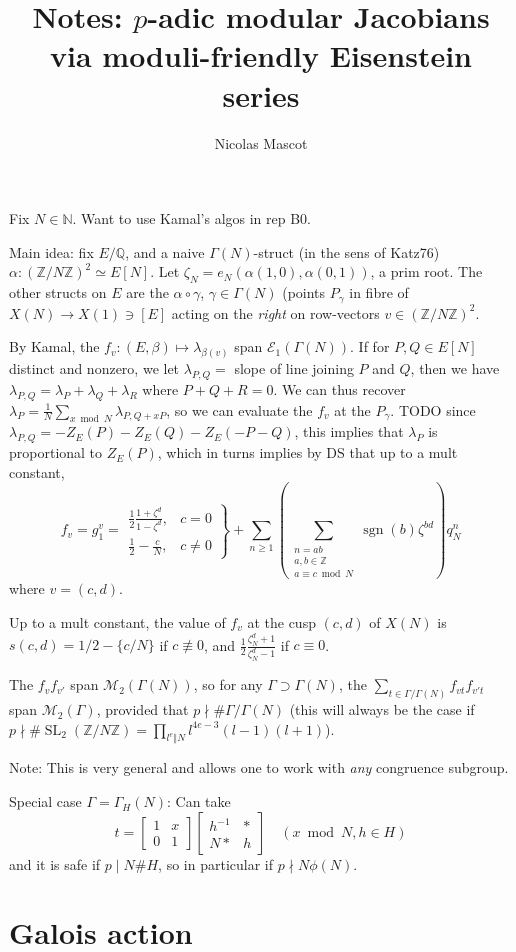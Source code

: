 \documentclass[12pt]{article}
\title{Notes: $p$-adic modular Jacobians via moduli-friendly Eisenstein series}
\author{Nicolas Mascot}
\newcommand{\N}{\mathbb{N}}
\newcommand{\Z}{\mathbb{Z}}
\newcommand{\Q}{\mathbb{Q}}
\newcommand{\M}{\mathcal{M}}
\newcommand{\E}{\mathcal{E}}
\newcommand{\SL}{\operatorname{SL}}
\newcommand{\sgn}{\operatorname{sgn}}
\newcommand{\smat}[4]{\left[ \begin{smallmatrix} #1 & #2 \\ #3 & #4 \end{smallmatrix} \right]}
\theoremstyle{definition}
\begin{document}
Fix $N \in \N$. Want to use Kamal's algos in rep B0.


Main idea: fix $E/\Q$, and a naive $\Gamma(N)$-struct (in the sens of Katz76) $\alpha: (\Z/N\Z)^2 \simeq E[N]$. Let $\zeta_N = e_N(\alpha(1,0),\alpha(0,1))$, a prim root. The other structs on $E$ are the $\alpha \circ \gamma$, $\gamma \in \Gamma(N)$ (points $P_\gamma$ in fibre of $X(N) \longrightarrow X(1) \ni [E]$ acting on the \emph{right} on row-vectors $v \in (\Z/N\Z)^2$.

By Kamal, the $f_v : (E,\beta) \mapsto \lambda_{\beta(v)}$ span $\E_1(\Gamma(N))$. If for $P,Q \in E[N]$ distinct and nonzero, we let $\lambda_{P,Q} = $ slope of line joining $P$ and $Q$, then we have $\lambda_{P,Q} = \lambda_P + \lambda_{Q} + \lambda_{R}$ where $P+Q+R=0$. We can thus recover $\lambda_P = \frac1N \sum_{x \bmod N} \lambda_{P,Q+xP}$, so we can evaluate the $f_v$ at the $P_\gamma$. TODO since $\lambda_{P,Q} = -Z_E(P)-Z_E(Q)-Z_E(-P-Q)$, this implies that $\lambda_P$ is proportional to $Z_E(P)$, which in turns implies by DS that up to a mult constant,
\[ f_v = g_1^v = \left. \begin{array}{cc} \frac12 \frac{1+\zeta^d}{1-\zeta^d}, & c =0 \\ \frac12 - \frac{c}N, & c \neq 0 \end{array} \right\} + \sum_{n \geqslant 1} \left( \sum_{\substack{n=ab \\ a,b \in \Z \\ a \equiv c \bmod N}} \sgn(b) \zeta^{bd} \right) q_N^n \]
where $v=(c,d)$. 

Up to a mult constant, the value of $f_v$ at the cusp $(c,d)$ of $X(N)$ is $s(c,d) = 1/2 - \{c/N\}$ if $c \not \equiv 0$, and $\frac12 \frac{\zeta_N^d+1}{\zeta_N^d-1}$ if $c \equiv 0$.

The $f_{v} f_{v'}$ span $\M_2(\Gamma(N))$, so for any $\Gamma \supset \Gamma(N)$, the $\sum_{t \in \Gamma / \Gamma(N)} f_{v t } f_{v' t}$ span $\M_2(\Gamma)$, provided that $p \nmid \# \Gamma/\Gamma(N)$ (this will always be the case if $p \nmid \#\SL_2(\Z/N\Z) = \prod_{l^e \Vert N} l^{4e-3} (l-1)(l+1)$).

Note: This is very general and allows one to work with \emph{any} congruence subgroup.

Special case $\Gamma = \Gamma_H(N)$: Can take
\[ t = \smat{1}{x}{0}{1} \smat{h^{-1}}{*}{N*}{h} \quad (x \bmod N, h \in H) \]
and it is safe if $p \mid N \#H$, so in particular if $p \nmid N \phi(N)$.

\section{Galois action}
\end{document}
